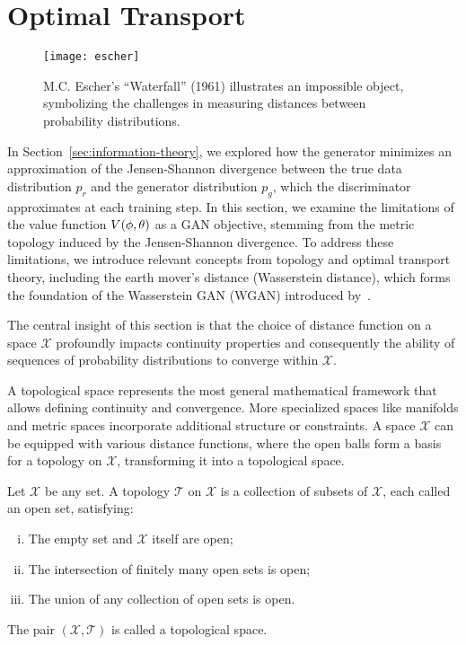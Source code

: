 \section{Optimal Transport}%
\label{sec:optimal-transport}
\vspace{1cm}
\begin{figure}[h]%
	\label{fig:paradise}
	\centering
	 {
		\texttt{[image: escher]}
	}
	\caption{M.C. Escher's ``Waterfall'' (1961) illustrates an impossible object, symbolizing the challenges in measuring distances between probability distributions.}
\end{figure}
\vspace{1cm}
\noindent In Section~\ref{sec:information-theory}, we explored how the generator minimizes an approximation of the Jensen-Shannon divergence between the true data distribution $p_r$ and the generator distribution $p_g$, which the discriminator approximates at each training step. In this section, we examine the limitations of the value function $V(\phi, \theta)$ as a GAN objective, stemming from the metric topology induced by the Jensen-Shannon divergence. To address these limitations, we introduce relevant concepts from topology and optimal transport theory, including the earth mover's distance (Wasserstein distance), which forms the foundation of the Wasserstein GAN (WGAN) introduced by~\cite{ref:arjovsky-2017}.

The central insight of this section is that the choice of distance function on a space $\mathcal{X}$ profoundly impacts continuity properties and consequently the ability of sequences of probability distributions to converge within $\mathcal{X}$.

A topological space represents the most general mathematical framework that allows defining continuity and convergence. More specialized spaces like manifolds and metric spaces incorporate additional structure or constraints. A space $\mathcal{X}$ can be equipped with various distance functions, where the open balls form a basis for a topology on $\mathcal{X}$, transforming it into a topological space.

\begin{definition}%
	\label{def:topology1}
	Let $\mathcal{X}$ be any set. A \textnormal{\sffamily topology} $\mathcal{T}$ on $\mathcal{X}$ is a
	collection of subsets of $\mathcal{X}$, each called an open set, satisfying:
	\begin{enumerate}[(i)]
		\item The empty set and $\mathcal{X}$ itself are open;
		\item The intersection of finitely many open sets is open;
		\item The union of any collection of open sets is open.
	\end{enumerate}
	The pair $(\mathcal{X}, \mathcal{T})$ is called a \textnormal{\sffamily topological space}.
\end{definition}

